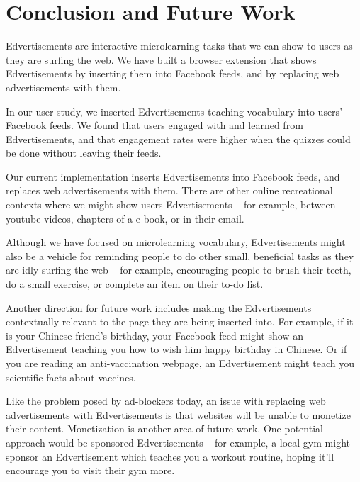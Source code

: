 \documentclass{sigchi}
\begin{document}
\section{Conclusion and Future Work}

Edvertisements are interactive microlearning tasks that we can show to users as they are surfing the web. We have built a browser extension that shows Edvertisements by inserting them into Facebook feeds, and by replacing web advertisements with them.

In our user study, we inserted Edvertisements teaching vocabulary into users' Facebook feeds. We found that users engaged with and learned from Edvertisements, and that engagement rates were higher when the quizzes could be done without leaving their feeds.

Our current implementation inserts Edvertisements into Facebook feeds, and replaces web advertisements with them. There are other online recreational contexts where we might show users Edvertisements -- for example, between youtube videos, chapters of a e-book, or in their email.

Although we have focused on microlearning vocabulary, Edvertisements might also be a vehicle for reminding people to do other small, beneficial tasks as they are idly surfing the web -- for example, encouraging people to brush their teeth, do a small exercise, or complete an item on their to-do list.

Another direction for future work includes making the Edvertisements contextually relevant to the page they are being inserted into. For example, if it is your Chinese friend's birthday, your Facebook feed might show an Edvertisement teaching you how to wish him happy birthday in Chinese. Or if you are reading an anti-vaccination webpage, an Edvertisement might teach you scientific facts about vaccines.


Like the problem posed by ad-blockers today, an issue with replacing web advertisements with Edvertisements is that websites will be unable to monetize their content. Monetization is another area of future work. One potential approach would be sponsored Edvertisements -- for example, a local gym might sponsor an Edvertisement which teaches you a workout routine, hoping it'll encourage you to visit their gym more. %
\end{document}

